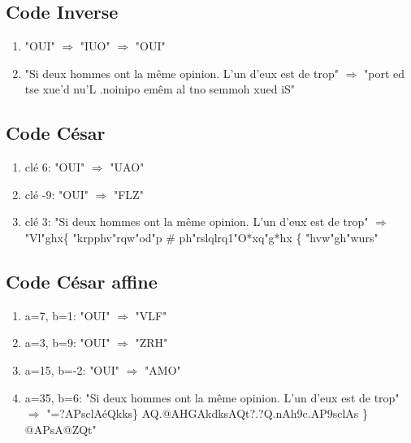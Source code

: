 \documentclass[10pt,a4paper,french]{article}
\begin{document}
\subsection{Code Inverse}
\begin{enumerate}
\item "OUI" $\Rightarrow$ "IUO" $\Rightarrow$ "OUI"
\item "Si deux hommes ont la même opinion. L'un d'eux est de trop" $\Rightarrow$ "port ed tse xue'd nu'L .noinipo emêm al tno semmoh xued iS"
\end{enumerate}
\subsection{Code César} 
\begin{enumerate}
\item clé 6: "OUI" $\Rightarrow$ "UAO"
\item clé -9: "OUI" $\Rightarrow$ "FLZ"
\item clé 3: "Si deux hommes ont la même opinion. L'un d'eux est de trop" $\Rightarrow$ "Vl"ghx\{ "krpphv"rqw"od"p \# ph"rslqlrq1"O*xq"g*hx \{ "hvw"gh"wurs"
\end{enumerate}
\subsection{Code César affine}
\begin{enumerate}
\item a=7, b=1: "OUI" $\Rightarrow$ "VLF"
\item a=3, b=9: "OUI" $\Rightarrow$ "ZRH"
\item a=15, b=-2: "OUI" $\Rightarrow$ "AMO"
\item a=35, b=6: "Si deux hommes ont la même opinion. L'un d'eux est de trop" $\Rightarrow$ "=?APsclAéQkks\} AQ.@AHGAkdksAQt?.?Q.nAh9c.AP9sclAs \} @APsA@ZQt"
\end{enumerate}
\end{document}
